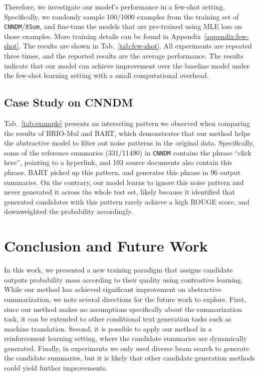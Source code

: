 \documentclass[11pt]{article}
\newcommand{\model}{BRIO\xspace}
\begin{document}
Therefore, we investigate our model's performance in a few-shot setting.
Specifically, we randomly sample 100/1000 examples from the training set of \texttt{CNNDM}/\texttt{XSum}, and fine-tune the models that are pre-trained using MLE loss on those examples.
More training details can be found in Appendix~\ref{appendix:few-shot}.
The results are shown in Tab.~\ref{tab:few-shot}.
All experiments are repeated three times, and the reported results are the average performance. 
The results indicate that our model can achieve improvement over the baseline model under the few-shot learning setting with a small computational overhead.






\subsection{Case Study on CNNDM}


Tab.~\ref{tab:example} presents an interesting pattern we observed when comparing the results of \model-Mul and BART, which demonstrates that our method helps the abstractive model to filter out noise patterns in the original data.
Specifically, some of the reference summaries (331/11490) in \texttt{CNNDM} contains the phrase ``click here'', pointing to a hyperlink, and 103 source documents also contain this phrase.
BART picked up this pattern, and generates this phrase in 96 output summaries.
On the contrary, our model learns to ignore this noise pattern and never generated it across the whole test set, likely because it identified that generated candidates with this pattern rarely achieve a high ROUGE score, and downweighted the probability accordingly.


\section{Conclusion and Future Work}

In this work, we presented a new training paradigm that assigns candidate outputs probability mass according to their quality using contrastive learning.
While our method has achieved significant improvement on abstractive summarization, we note several directions for the future work to explore.
First, since our method makes no assumptions specifically about the summarization task, it can be extended to other conditional text generation tasks such as machine translation.
Second, it is possible to apply  our method in a reinforcement learning setting, where the candidate summaries are dynamically generated.
Finally, in experiments we only used diverse beam search to generate the candidate summaries, but it is likely that other candidate generation methods could yield further improvements.
\end{document}
